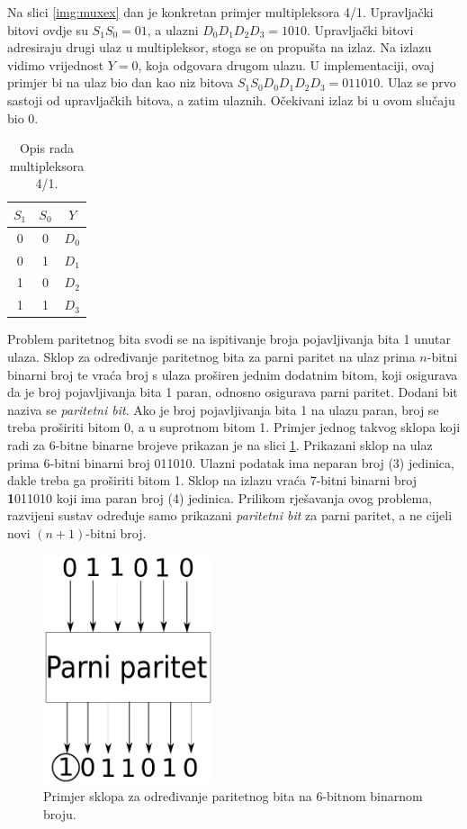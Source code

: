 \documentclass[times, utf8, zavrsni]{fer}
\begin{document}
Na slici \ref{img:muxex} dan je konkretan primjer multipleksora 4/1.
Upravljački bitovi ovdje su $S_{1}S_{0} = 01$, a ulazni $D_{0}D_{1}D_{2}D_{3} = 1010$.
Upravljački bitovi adresiraju drugi ulaz u multipleksor, stoga se on propušta na izlaz.
Na izlazu vidimo vrijednost $Y = 0$, koja odgovara drugom ulazu.
U implementaciji, ovaj primjer bi na ulaz bio dan kao niz bitova $S_{1}S_{0}D_{0}D_{1}D_{2}D_{3} = 011010$.
Ulaz se prvo sastoji od upravljačkih bitova, a zatim ulaznih.
Očekivani izlaz bi u ovom slučaju bio 0.
\begin{table}[!htb]
    \caption{Opis rada multipleksora 4/1.}
    \label{tbl:mux}
    \centering
    \begin{tabular}{c | c | c}
        $S_{1}$ & $S_{0}$ & $Y$     \\ \hline
              0 &       0 & $D_{0}$ \\
              0 &       1 & $D_{1}$ \\
              1 &       0 & $D_{2}$ \\
              1 &       1 & $D_{3}$ \\
    \end{tabular}
\end{table}

Problem paritetnog bita svodi se na ispitivanje broja pojavljivanja bita 1 unutar ulaza.
Sklop za određivanje paritetnog bita za parni paritet na ulaz prima $n$-bitni binarni broj te vraća broj s ulaza proširen jednim dodatnim bitom, koji osigurava da je broj pojavljivanja bita 1 paran, odnosno osigurava parni paritet.
Dodani bit naziva se \emph{paritetni bit}.
Ako je broj pojavljivanja bita 1 na ulazu paran, broj se treba proširiti bitom 0, a u suprotnom bitom 1.
Primjer jednog takvog sklopa koji radi za 6-bitne binarne brojeve prikazan je na slici \ref{img:parex}. Prikazani sklop na ulaz prima 6-bitni binarni broj 011010.
Ulazni podatak ima neparan broj (3) jedinica, dakle treba ga proširiti bitom 1.
Sklop na izlazu vraća 7-bitni binarni broj \textbf{1}011010 koji ima paran broj (4) jedinica.
Prilikom rješavanja ovog problema, razvijeni sustav određuje samo prikazani \emph{paritetni bit} za parni paritet, a ne cijeli novi $(n + 1)$-bitni broj.
\begin{figure}[h]
    \centering
    \includegraphics[width=5cm]{img/parity.pdf}
    \caption{Primjer sklopa za određivanje paritetnog bita na 6-bitnom binarnom broju.}
    \label{img:parex}
\end{figure}
\end{document}
